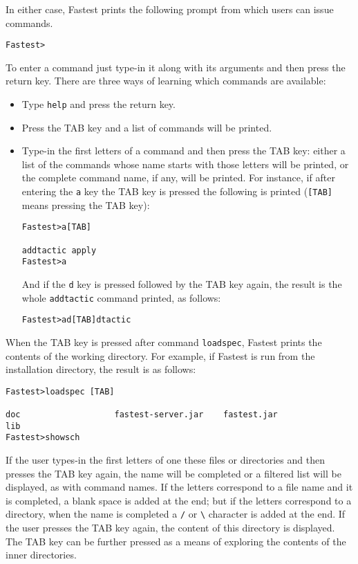 In either case, Fastest prints the following prompt from which users can issue commands. 

\begin{verbatim}
Fastest>
\end{verbatim}

To enter a command just type-in it along with its arguments and then press the return key. There are three ways of learning which commands are available:

\begin{itemize}
\item Type \verb+help+ and press the return key.

\item Press the TAB key and a list of commands will be printed.

\item Type-in the first letters of a command and then press the TAB key: either a list of the commands whose name starts with those letters will be printed, or the complete command name, if any, will be printed. For instance, if after entering the \verb+a+ key the TAB key is pressed the following is printed (\verb+[TAB]+ means pressing the TAB key):

\begin{verbatim}
Fastest>a[TAB]

addtactic apply
Fastest>a
\end{verbatim}

And if the \verb+d+ key is pressed followed by the TAB key again, the result is the whole \verb+addtactic+ command printed, as follows:

\begin{verbatim}
Fastest>ad[TAB]dtactic 
\end{verbatim}
\end{itemize}

When the TAB key is pressed after command \verb+loadspec+, Fastest prints the contents of the working directory. For example, if Fastest is run from the installation directory, the result is as follows:

\begin{verbatim}
Fastest>loadspec [TAB]

doc                   fastest-server.jar    fastest.jar
lib
Fastest>showsch
\end{verbatim}

If the user types-in the first letters of one these files or directories and then presses the TAB key again, the name will be completed or a filtered list will be displayed, as with command names. If the letters correspond to a file name and it is completed, a blank space is added at the end; but if the letters correspond to a directory, when the name is completed a \verb+/+ or \verb+\+ character is added at the end. If the user presses the TAB key again, the content of this directory is displayed. The TAB key can be further pressed as a means of exploring the contents of the inner directories.

